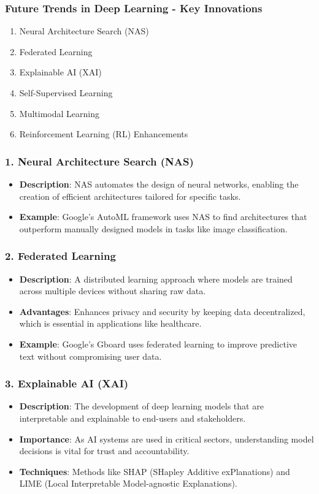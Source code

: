 \documentclass[aspectratio=169]{beamer}
\begin{document}
\begin{frame}[fragile]
    \frametitle{Future Trends in Deep Learning - Key Innovations}
    \begin{enumerate}
        \item Neural Architecture Search (NAS)
        \item Federated Learning
        \item Explainable AI (XAI)
        \item Self-Supervised Learning
        \item Multimodal Learning
        \item Reinforcement Learning (RL) Enhancements
    \end{enumerate}
\end{frame}

\begin{frame}[fragile]
    \frametitle{1. Neural Architecture Search (NAS)}
    \begin{itemize}
        \item \textbf{Description}: NAS automates the design of neural networks, enabling the creation of efficient architectures tailored for specific tasks.
        \item \textbf{Example}: Google's AutoML framework uses NAS to find architectures that outperform manually designed models in tasks like image classification.
    \end{itemize}
\end{frame}

\begin{frame}[fragile]
    \frametitle{2. Federated Learning}
    \begin{itemize}
        \item \textbf{Description}: A distributed learning approach where models are trained across multiple devices without sharing raw data.
        \item \textbf{Advantages}: Enhances privacy and security by keeping data decentralized, which is essential in applications like healthcare.
        \item \textbf{Example}: Google’s Gboard uses federated learning to improve predictive text without compromising user data.
    \end{itemize}
\end{frame}

\begin{frame}[fragile]
    \frametitle{3. Explainable AI (XAI)}
    \begin{itemize}
        \item \textbf{Description}: The development of deep learning models that are interpretable and explainable to end-users and stakeholders.
        \item \textbf{Importance}: As AI systems are used in critical sectors, understanding model decisions is vital for trust and accountability.
        \item \textbf{Techniques}: Methods like SHAP (SHapley Additive exPlanations) and LIME (Local Interpretable Model-agnostic Explanations).
    \end{itemize}
\end{frame}
\end{document}
